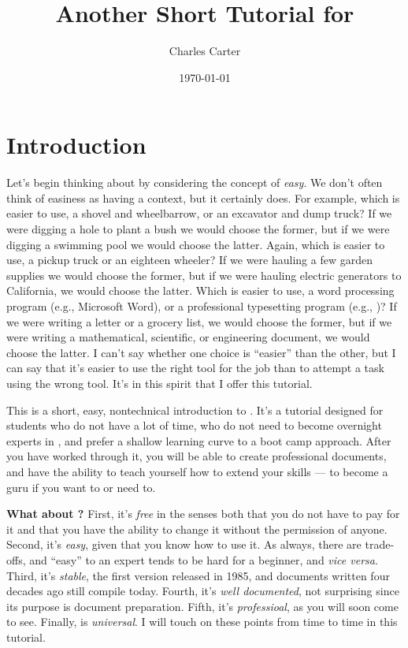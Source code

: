 \documentclass[letterpaper]{article}
\title{Another Short Tutorial for \LaTeXe}
\author{Charles Carter}
\date{\today{}}
\newcommand{\Lx}{\LaTeXe}
\begin{document}
    \maketitle{}
    
    \tableofcontents{}
    \listoffigures{}
    \listoftables{}

    \newpage{}

    \section{Introduction}
    \label{Introduction}

    Let's begin thinking about \Lx{}  by considering the concept of \textit{easy}. We don't often think of easiness as having a context, but it certainly does. For example, which is easier to use, a shovel and wheelbarrow, or an excavator and dump truck? If we were digging a hole to plant a bush we would choose the former, but if we were digging a swimming pool we would choose the latter. Again, which is easier to use, a pickup truck or an eighteen wheeler? If we were hauling a few garden supplies we would choose the former, but if we were hauling electric generators to California, we would choose the latter. Which is easier to use, a word processing program (e.g., Microsoft Word), or a professional typesetting program (e.g., \Lx{})? If we were writing a letter or a grocery list, we would choose the former, but if we were writing a mathematical, scientific, or engineering document, we would choose the latter. I can't say whether one choice is ``easier'' than the other, but I can say that it's easier to use the right tool for the job than to attempt a task using the wrong tool. It's in this spirit that I offer this tutorial. 

    This is a short, easy, nontechnical introduction to \LaTeXe{}. It's a tutorial designed for students who do not have a lot of time, who do not need to become overnight experts in \LaTeXe{}, and prefer a shallow learning curve to a boot camp approach.  After you have worked through it, you will be able to create professional documents, and have the ability to teach yourself how to extend your \LaTeXe{} skills --- to become a \LaTeXe{} guru if you want to or need to.

        \textbf{What about \Lx{}?} First, it's \textit{free} in the senses both that you do not have to pay for it and that you have the ability to change it without the permission of anyone. Second, it's \textit{easy}, given that you know how to use it. As always, there are trade-offs, and ``easy'' to an expert tends to be hard for a beginner, and \textit{vice versa}. Third, it's \textit{stable}, the first version released in 1985, and documents written four decades ago still compile today. Fourth, it's \textit{well documented}, not surprising since its purpose is document preparation. Fifth, it's \textit{professioal}, as you will soon come to see. Finally, \Lx{} is \textit{universal}. I will touch on these points from time to time in this tutorial.
\end{document}
